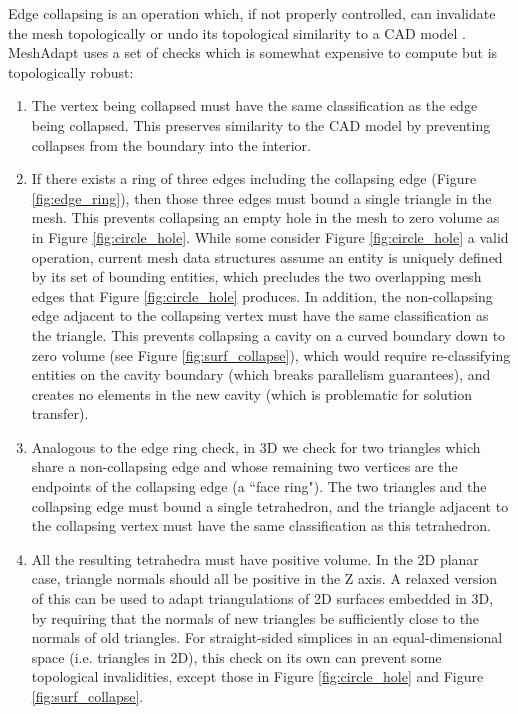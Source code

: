 Edge collapsing is an operation which, if not properly controlled,
can invalidate the mesh topologically or undo its topological similarity
to a CAD model \cite{schroeder1990combined}.
MeshAdapt uses a set of checks which is somewhat expensive to compute
but is topologically robust:

\begin{enumerate}
\item The vertex being collapsed must have the same classification as
the edge being collapsed. This preserves similarity to the CAD model by
preventing collapses from the boundary into the interior.
\item If there exists a ring of three edges including the collapsing edge
(Figure \ref{fig:edge_ring}),
then those three edges must bound a single triangle in the mesh.
This prevents collapsing an empty hole in the mesh to zero volume as in
Figure \ref{fig:circle_hole}.
While some \cite{beall1997general} consider Figure \ref{fig:circle_hole}
a valid operation, current mesh data structures assume an entity is uniquely
defined by its set of bounding entities, which precludes the two overlapping
mesh edges that Figure \ref{fig:circle_hole} produces.
In addition, the non-collapsing edge adjacent to the collapsing vertex must have the same
classification as the triangle.
This prevents collapsing a cavity on a curved boundary down to zero volume
(see Figure \ref{fig:surf_collapse}), which would require re-classifying
entities on the cavity boundary (which breaks parallelism guarantees), and
creates no elements in the new cavity (which is problematic for solution transfer).
\item Analogous to the edge ring check, in 3D we check for two triangles which
share a non-collapsing edge and whose remaining two vertices are the endpoints
of the collapsing edge (a ``face ring").
The two triangles and the collapsing edge must bound a single tetrahedron,
and the triangle adjacent to the collapsing vertex must have the same classification
as this tetrahedron.
\item All the resulting tetrahedra must have positive volume.
In the 2D planar case, triangle normals should all be positive in the Z axis.
A relaxed version of this can be used to adapt triangulations of 2D surfaces
embedded in 3D, by requiring that the normals of new triangles be sufficiently
close to the normals of old triangles.
For straight-sided simplices in an equal-dimensional space (i.e. triangles in 2D),
this check on its own can prevent some topological invalidities, except
those in Figure \ref{fig:circle_hole} and Figure \ref{fig:surf_collapse}.
\end{enumerate}

